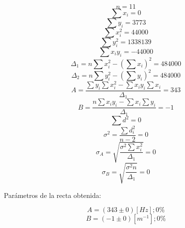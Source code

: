 \documentclass[letter,11pt]{article}
\begin{document}
\begin{equation*}
    n = 11
\end{equation*}
\begin{equation*}
    \sum x_i = 0
\end{equation*}
\begin{equation*}
    \sum y_i = 3773
\end{equation*}
\begin{equation*}
    \sum x^2_i = 44000
\end{equation*}
\begin{equation*}
    \sum y^2_i = 1338139
\end{equation*}
\begin{equation*}
    \sum x_i y_i = -44000
\end{equation*}
\begin{equation*}
    \Delta_1 = n \sum x^2_i - \left( \sum x_i \right)^2 = 484000
\end{equation*}
\begin{equation*}
    \Delta_2 = n \sum y^2_i - \left( \sum y_i \right)^2 = 484000
\end{equation*}
\begin{equation*}
    A = \frac{\sum y_i \sum x^2_i - \sum x_i y_i \sum x_i}{\Delta_1} = 343
\end{equation*}
\begin{equation*}
    B = \frac{n \sum x_i y_i - \sum x_i \sum y_i}{\Delta_1} = -1
\end{equation*}
\begin{equation*}
    \sum d^2 = 0
\end{equation*}
\begin{equation*}
    \sigma^2 = \frac{\sum d^2_i}{n-2} = 0
\end{equation*}
\begin{equation*}
    \sigma_A = \sqrt{\frac{\sigma^2 \sum x^2_i}{\Delta_1}} = 0
\end{equation*}
\begin{equation*}
    \sigma_B = \sqrt{\frac{\sigma^2 n}{\Delta_1}} = 0
\end{equation*}
\vspace{0.10cm}

Parámetros de la recta obtenida:

\begin{equation*}
    A = (343 \pm 0) [Hz]; 0\%
\end{equation*}
\begin{equation*}
    B = (-1 \pm 0) [m^{-1}]; 0\%
\end{equation*}
\vspace{0.10cm}
\end{document}
